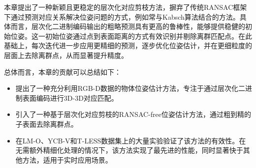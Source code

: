 本章提出了一种新颖且更稳定的层次化对应剪枝方法，摒弃了传统RANSAC框架下通过预测对应关系解决位姿问题的方式，例如常与Kabsch算法\cite{umeyama1991least}结合的方法。具体而言，层次化二进制编码输出的粗略预测具有更高的鲁棒性，能够提供稳健的初始位姿。这一初始位姿通过点到表面距离的方式有效识别并剔除离群匹配点。在此基础上，每次迭代进一步应用更精细的预测，逐步优化位姿估计，并在更细粒度的层面上去除离群点，从而显著提升精度。

总体而言，本章的贡献可以总结如下：
\begin{itemize}
\item 提出了一种充分利用RGB-D数据的物体位姿估计方法，专注于通过层次化二进制表面编码进行3D-3D对应匹配。
\item 引入了一种基于层次化对应剪枝的RANSAC-free位姿估计方法，通过粗到精的子表面去除离群点。
\item 在LM-O、YCB-V和T-LESS数据集上的大量实验验证了该方法的有效性。在无需额外精细化处理的情况下，该方法实现了最先进的性能，同时显著快于其他方法，适用于实时应用场景。
\end{itemize}
